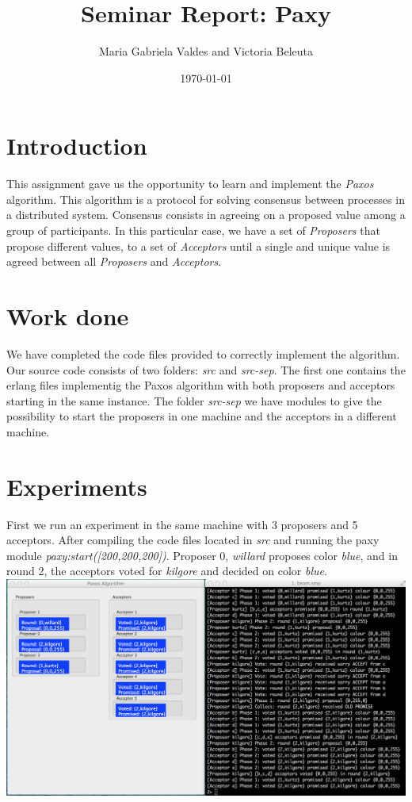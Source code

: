 \documentclass[a4paper, 11pt]{article}
\title{Seminar Report: Paxy}
\author{Maria Gabriela Valdes and Victoria Beleuta}
\date{\today{}}
\begin{document}
\maketitle

\section{Introduction}

This assignment gave us the opportunity to learn and implement the \textit{Paxos} algorithm. This algorithm is a protocol for solving consensus between processes in a distributed system. Consensus consists in agreeing on a proposed value among a group of participants. In this particular case, we have a set of \textit{Proposers} that propose different values, to a set of \textit{Acceptors} until a single and unique value is agreed between all \textit{Proposers} and \textit{Acceptors}.

\section{Work done}

We have completed the code files provided to correctly implement the algorithm. Our source code consists of two folders: \textit{src} and \textit{src-sep}. The first one contains the erlang files implementig the Paxos algorithm with both proposers and acceptors starting in the same instance. The folder \textit{src-sep} we have modules to give the possibility to start the proposers in one machine and the acceptors in a different machine.

\section{Experiments}

First we run an experiment in the same machine with 3 proposers and 5 acceptors. After compiling the code files located in \textit{src} and running the paxy module \textit{paxy:start([200,200,200])}. Proposer 0, \textit{willard} proposes color \textit{blue}, and in round 2, the acceptors voted for \textit{kilgore} and decided on color \textit{blue}.\\
\includegraphics[scale=0.35]{images/exp0.png} \\\\
\end{document}
